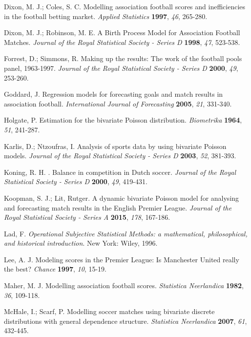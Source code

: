 \documentclass[journal,article,accept,moreauthors,pdftex,12pt,a4paper]{mdpi}
\begin{document}
\begin{thebibliography}{999}
			 Dixon, M. J.; Coles, S. C. Modelling association football scores and inefficiencies in the football betting market. {\em Applied Statistics} {\bf 1997}, {\em 46}, 265-280.
			
			 Dixon, M. J.; Robinson, M. E. A Birth Process Model for Association Football Matches. {\em Journal of the Royal Statistical Society - Series D}
			{\bf 1998}, {\em 47}, 523-538.
			
			 Forrest, D.; Simmons, R. Making up the results: The work
			of the football pools panel, 1963-1997. {\em Journal of the Royal Statistical Society - Series D} {\bf 2000}, {\em 49}, 253-260.
			
			Goddard, J. Regression models for forecasting goals and match
			results in association football. {\em International Journal of
				Forecasting} {\bf 2005}, {\em 21}, 331-340.
			
			Holgate, P. Estimation for the bivariate Poisson distribution. {\em Biometrika} {\bf 1964}, {\em 51}, 241-287.
			
			Karlis, D.; Ntzoufras, I. Analysis of sports data by using bivariate
			Poisson models. {\em Journal of the Royal Statistical Society - Series D} {\bf 2003}, {\em 52}, 381-393.
			
			Koning, R. H. . Balance in competition in Dutch soccer. {\em Journal of the Royal Statistical Society - Series D} {\bf 2000}, {\em 49}, 419-431.
			
			Koopman, S. J.; Lit, Rutger. A dynamic bivariate Poisson model for
			analysing and forecasting match results in the English Premier
			League. {\em Journal of the Royal Statistical Society - Series A}
			{\bf 2015}, {\em 178}, 167-186.
			
			Lad, F. {\it Operational Subjective Statistical Methods: a mathematical,
				philosophical, and historical introduction}. New York: Wiley, 1996.
			
			Lee, A. J. Modeling scores in the Premier League: Is Manchester United really the best? {\em Chance} {\bf 1997}, {\em 10}, 15-19.
			
			Maher, M. J. Modelling association football scores. {\em Statistica Neerlandica} {\bf 1982}, {\em 36}, 109-118.
			
			McHale, I.; Scarf, P. Modelling soccer matches using bivariate
			discrete distributions with general dependence structure. {\em
				Statistica Neerlandica} {\bf 2007}, {\em 61}, 432-445.
			

\end{thebibliography}
\end{document}
